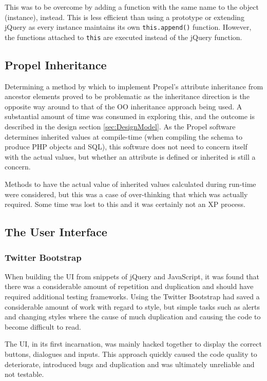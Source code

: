 This was to be overcome by adding a function with the same name to the object (instance), instead. This is less efficient than using a prototype or extending jQuery as every instance maintains its own \texttt{this.append()} function. However, the functions attached to \texttt{this} are executed instead of the jQuery function.

\subsection{Propel Inheritance}
Determining a method by which to implement Propel's attribute inheritance from ancestor elements proved to be problematic as the inheritance direction is the opposite way around to that of the OO inheritance approach being used. A substantial amount of time was consumed in exploring this, and the outcome is described in the design section \ref{sec:DesignModel}. As the Propel software determines inherited values at compile-time (when compiling the schema to produce PHP objects and SQL), this software does not need to concern itself with the actual values, but whether an attribute is defined or inherited is still a concern.

Methods to have the actual value of inherited values calculated during run-time were considered, but this was a case of over-thinking that which was actually required. Some time was lost to this and it was certainly not an XP process.

\subsection{The User Interface}
\subsubsection{Twitter Bootstrap}
When building the UI from snippets of jQuery and Java\-Script, it was found that there was a considerable amount of repetition and duplication and should have required additional testing frameworks. Using the Twitter Bootstrap had saved a considerable amount of work with regard to style, but simple tasks such as alerts and changing styles where the cause of much duplication and causing the code to become difficult to read.

The UI, in its first incarnation, was mainly hacked together to display the correct buttons, dialogues and inputs. This approach quickly caused the code quality to deteriorate, introduced bugs and duplication and was ultimately unreliable and not testable.

